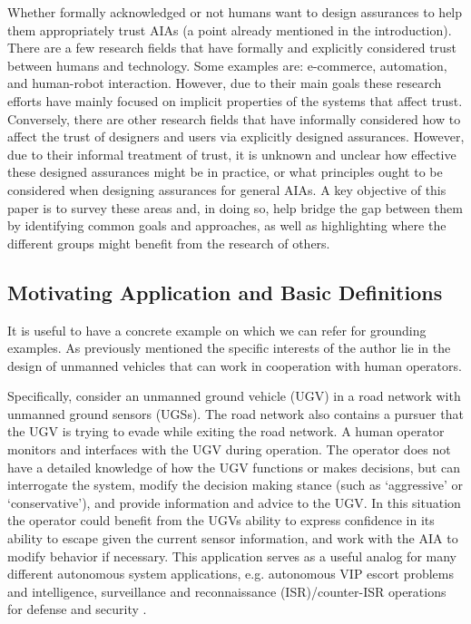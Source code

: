     Whether formally acknowledged or not humans want to design assurances to help them appropriately trust AIAs (a point already mentioned in the introduction). There are a few research fields that have formally and explicitly considered trust between humans and technology. Some examples are: e-commerce, automation, and human-robot interaction. However, due to their main goals these research efforts have mainly focused on implicit properties of the systems that affect trust. Conversely, there are other research fields that have informally considered how to affect the trust of designers and users via explicitly designed assurances. However, due to their informal treatment of trust, it is unknown and unclear how effective these designed assurances might be in practice, or what principles ought to be considered when designing assurances for general AIAs. A key objective of this paper is to survey these areas and, in doing so, help bridge the gap between them by identifying common goals and approaches, as well as highlighting where the different groups might benefit from the research of others.

\subsection{Motivating Application and Basic Definitions} \label{sec:mot_example}
    It is useful to have a concrete example on which we can refer for grounding examples. As previously mentioned the specific interests of the author lie in the design of unmanned vehicles that can work in cooperation with human operators.

    Specifically, consider an unmanned ground vehicle (UGV) in a road network with unmanned ground sensors (UGSs). The road network also contains a pursuer that the UGV is trying to evade while exiting the road network. A human operator monitors and interfaces with the UGV during operation. The operator does not have a detailed knowledge of how the UGV functions or makes decisions, but can interrogate the system, modify the decision making stance (such as `aggressive' or `conservative'), and provide information and advice to the UGV. In this situation the operator could benefit from the UGVs ability to express confidence in its ability to escape given the current sensor information, and work with the AIA to modify behavior if necessary. This application serves as a useful analog for many different autonomous system applications, e.g. autonomous VIP escort problems and intelligence, surveillance and reconnaissance (ISR)/counter-ISR operations for defense and security \cite{Kingston2012-va}.
   
